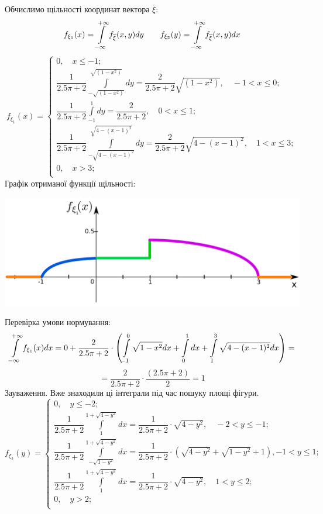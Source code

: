 \documentclass[14pt,a4paper]{scrartcl}
\theoremstyle{definition}
\theoremstyle{remark}
\theoremstyle{definition}
\theoremstyle{definition}
\begin{document}
Обчислимо щільності координат вектора $\overline{\xi}$:
$$
f_{\xi_1} (x) =  \int\limits_{-\infty}^{ +\infty}{ f_{\overline{\xi}} (x,y) dy} \qquad f_{\xi_2}(y) =  \int\limits_{-\infty}^{ +\infty}{ f_{\overline{\xi}} (x,y) dx}
$$
$$
f_{\xi_1}(x) = \begin{cases}
0, \quad x \leq -1 ;\\
	\dfrac{1}{2.5\pi + 2}  \int\limits_{-\sqrt{(1-x^2)}}^{ \sqrt{(1-x^2)}}{dy} = \dfrac{2}{2.5\pi + 2} \sqrt{(1-x^2)}, \quad -1 < x \leq 0; \\
	\dfrac{1}{2.5\pi + 2}  \int\limits_{-1}^{ 1}{dy} = \dfrac{2}{2.5\pi + 2}, \quad 0 < x \leq 1; \\
	\dfrac{1}{2.5\pi + 2} \int\limits_{ -\sqrt{4 - (x-1)^2}}^{ \sqrt{4 - (x-1)^2}}{ dy} = \dfrac{2}{2.5\pi + 2} \sqrt{4 - (x-1)^2}, \quad 1 < x \leq 3; \\
	0, \quad x > 3 ;\\
\end{cases}
$$
Графік отриманої функції щільності:
\begin{center} \includegraphics[scale=0.37]{assets/fxi11.png} \end{center}
Перевірка умови нормування:
$$
 \int\limits_{-\infty}^{ +\infty}{ f_{\xi_1} (x) dx} = 0 + \frac{2}{2.5\pi + 2}  \cdot \left(
\int\limits_{-1}^{ 0}{ \sqrt{1-x^2}dx} +  \int\limits_{0}^{ 1}{dx} +  \int\limits_{1}^{ 3}{\sqrt{4 - (x-1)^2}dx}
  \right) =
$$
$$
=  \dfrac{2}{2.5\pi + 2} \cdot \frac{(2.5\pi +2 )}{2}  =1
$$
Зауваження. Вже знаходили ці інтеграли під час пошуку площі фігури.
$$
f_{\xi_2} (y) = \begin{cases}
	0, \quad y \leq  -2;\\
	\dfrac{1}{2.5\pi + 2}  \int\limits_{1}^{ 1+ \sqrt{4 - y^2}}{dx} = \dfrac{1}{2.5\pi + 2} \cdot \sqrt{4 - y^2}, \quad -2 < y \leq -1;\\
	\dfrac{1}{2.5\pi + 2}   \int\limits_{- \sqrt{1-y^2}}^{1+ \sqrt{4 - y^2}}{dx}
	=  \dfrac{1}{2.5\pi + 2} \cdot \left( \sqrt{4 - y^2} + \sqrt{1-y^2}+ 1  \right),  -1 < y \leq 1; \\
		\dfrac{1}{2.5\pi + 2}  \int\limits_{1}^{ 1+ \sqrt{4 - y^2}}{dx} = \dfrac{1}{2.5\pi + 2} \cdot \sqrt{4 - y^2}, \quad 1 < y \leq 2;\\
			0, \quad y >  2;\\
\end{cases}
$$
\end{document}
